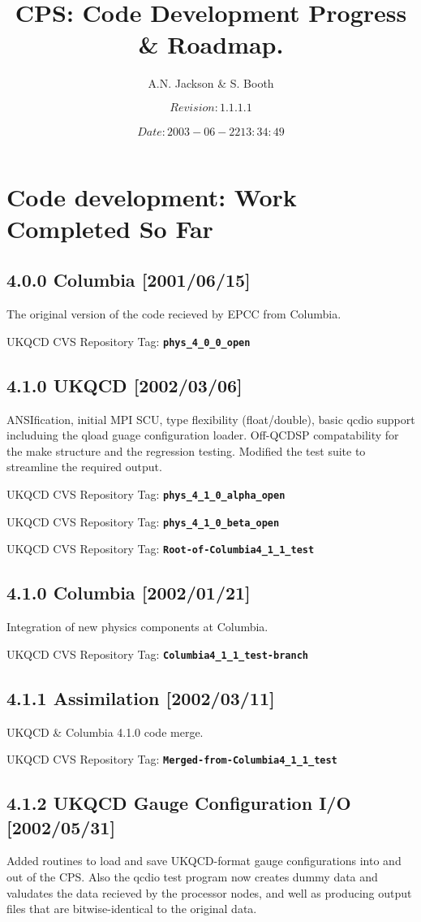 \documentclass[12pt]{article}
\title{CPS: Code Development Progress \& Roadmap.}
\author{A.N. Jackson \& S. Booth}
\date{\mbox{\small $$Revision: 1.1.1.1 $$  $$Date: 2003-06-22 13:34:49 $$}}
\newcommand{\ukqcdtag}[1]{{\small{UKQCD CVS Repository Tag: }{\bf{\tt{#1}}}}}
\begin{document}
\maketitle

\tableofcontents
\newpage

\section{Code development: Work Completed So Far}

\subsection{4.0.0 Columbia [2001/06/15]}
The original version of the code recieved by EPCC from Columbia.

\ukqcdtag{phys\_4\_0\_0\_open}

\subsection{4.1.0  UKQCD [2002/03/06]}
ANSIfication, initial MPI SCU, type flexibility (float/double), basic qcdio
support includuing the qload guage configuration loader.  Off-QCDSP
compatability for the make structure and the regression testing.  Modified the
test suite to streamline the required output.

\ukqcdtag{phys\_4\_1\_0\_alpha\_open}

\ukqcdtag{phys\_4\_1\_0\_beta\_open}

\ukqcdtag{Root-of-Columbia4\_1\_1\_test}

\subsection{4.1.0 Columbia [2002/01/21]}
Integration of new physics components at Columbia.

\ukqcdtag{Columbia4\_1\_1\_test-branch}

\subsection{4.1.1 Assimilation [2002/03/11]}
UKQCD \& Columbia 4.1.0 code merge.

\ukqcdtag{Merged-from-Columbia4\_1\_1\_test}

\subsection{4.1.2 UKQCD Gauge Configuration I/O [2002/05/31]}
Added routines to load and save UKQCD-format gauge configurations into and out
of the CPS.  Also the qcdio test program now creates dummy data and valudates
the data recieved by the processor nodes, and well as producing output files
that are bitwise-identical to the original data.
\end{document}

